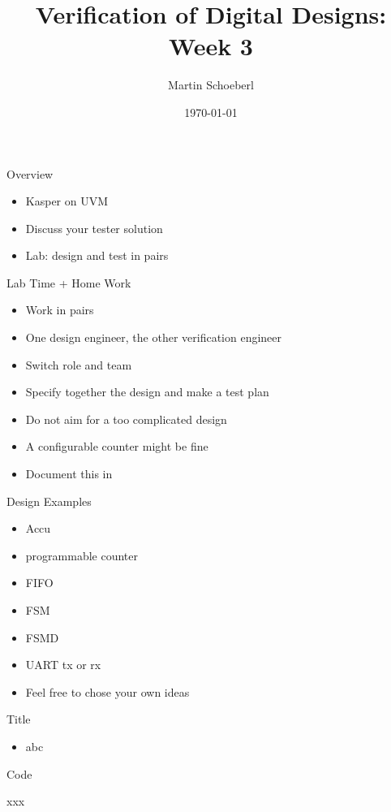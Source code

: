 

\newif\ifbook


\title{Verification of Digital Designs: Week 3}
\author{Martin Schoeberl}
\date{\today}



\begin{frame}
\titlepage
\end{frame}

\begin{frame}[fragile]{Overview}
\begin{itemize}
\item Kasper on UVM
\item Discuss your tester solution
\item Lab: design and test in pairs
\end{itemize}
\end{frame}


\begin{frame}[fragile]{Lab Time + Home Work}
\begin{itemize}
\item Work in pairs
\item One design engineer, the other verification engineer
\item Switch role and team
\item Specify together the design and make a test plan
\item Do not aim for a too complicated design
\item A configurable counter might be fine
\item Document this in 
\end{itemize}
\end{frame}

\begin{frame}[fragile]{Design Examples}
\begin{itemize}
\item Accu
\item programmable counter
\item FIFO
\item FSM
\item FSMD
\item UART tx or rx
\item Feel free to chose your own ideas
\end{itemize}
\end{frame}



\begin{frame}[fragile]{Title}
\begin{itemize}
\item abc
\end{itemize}
\end{frame}

\begin{frame}[fragile]{Code}
\begin{chisel}
xxx
\end{chisel}
\end{frame}

